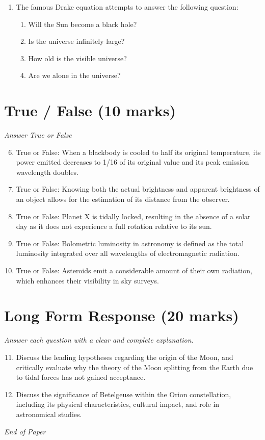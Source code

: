 \documentclass[12pt]{article}
\begin{document}
\begin{enumerate}[label=\arabic*.]
\begin{enumerate}[label=(\alph*)]
    \item the craters on the Moon
    \item asteroids Kuiper-belt comets and the Oort cloud
\end{enumerate}
\item The famous Drake equation attempts to answer the following question:
\begin{enumerate}[label=(\alph*)]
    \item Will the Sun become a black hole?
    \item Is the universe infinitely large?
    \item How old is the visible universe?
    \item Are we alone in the universe?
\end{enumerate}
\end{enumerate}

\section*{True / False (10 marks)}
\textit{Answer True or False}
\begin{enumerate}[label=\arabic*.]
\setcounter{enumi}{5}
\item True or False: When a blackbody is cooled to half its original temperature, its power emitted decreases to 1/16 of its original value and its peak emission wavelength doubles.
\item True or False: Knowing both the actual brightness and apparent brightness of an object allows for the estimation of its distance from the observer.
\item True or False: Planet X is tidally locked, resulting in the absence of a solar day as it does not experience a full rotation relative to its sun.
\item True or False: Bolometric luminosity in astronomy is defined as the total luminosity integrated over all wavelengths of electromagnetic radiation.
\item True or False: Asteroids emit a considerable amount of their own radiation, which enhances their visibility in sky surveys.
\end{enumerate}

\section*{Long Form Response (20 marks)}
\textit{Answer each question with a clear and complete explanation.}
\begin{enumerate}[label=\arabic*.]
\setcounter{enumi}{10}
\item Discuss the leading hypotheses regarding the origin of the Moon, and critically evaluate why the theory of the Moon splitting from the Earth due to tidal forces has not gained acceptance.
\item Discuss the significance of Betelgeuse within the Orion constellation, including its physical characteristics, cultural impact, and role in astronomical studies.
\end{enumerate}

\vfill
\noindent\textit{End of Paper}
\end{document}
